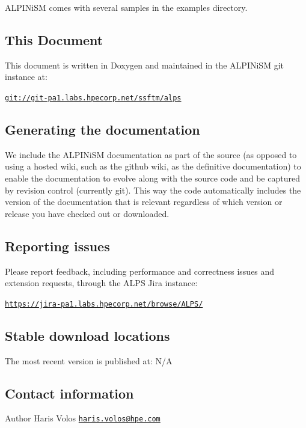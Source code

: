 A\+L\+P\+I\+Ni\+SM comes with several samples in the {\ttfamily examples} directory.

\subsection*{This Document}

This document is written in Doxygen and maintained in the A\+L\+P\+I\+Ni\+SM git instance at\+:

\href{git://git-pa1.labs.hpecorp.net/ssftm/alps}{\tt git\+://git-\/pa1.labs.\+hpecorp.\+net/ssftm/alps}

\subsection*{Generating the documentation}

We include the A\+L\+P\+I\+Ni\+SM documentation as part of the source (as opposed to using a hosted wiki, such as the github wiki, as the definitive documentation) to enable the documentation to evolve along with the source code and be captured by revision control (currently git). This way the code automatically includes the version of the documentation that is relevant regardless of which version or release you have checked out or downloaded.



\subsection*{Reporting issues}

Please report feedback, including performance and correctness issues and extension requests, through the A\+L\+PS Jira instance\+:

\href{https://jira-pa1.labs.hpecorp.net/browse/ALPS/}{\tt https\+://jira-\/pa1.\+labs.\+hpecorp.\+net/browse/\+A\+L\+P\+S/}

\subsection*{Stable download locations}

The most recent version is published at\+: N/A

\subsection*{Contact information}

\begin{DoxyAuthor}{Author}
Haris Volos \href{mailto:haris.volos@hpe.com}{\tt haris.\+volos@hpe.\+com} 
\end{DoxyAuthor}
